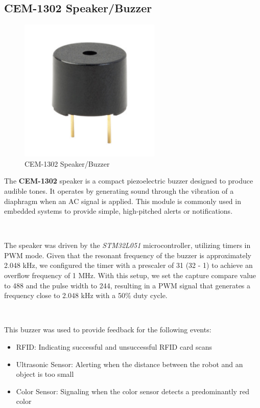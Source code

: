 \documentclass{article}
\begin{document}
\subsection{CEM-1302 Speaker/Buzzer}
\label{sec:speaker}
\begin{figure}[H]
    \centering
    \includegraphics[width=0.6\textwidth]{Figures/speaker.png} %
    \caption{CEM-1302 Speaker/Buzzer}
    \label{fig:speaker}


\end{figure}

The \textbf{CEM-1302} speaker is a compact piezoelectric buzzer designed to produce audible tones. It operates by generating sound through the vibration of a diaphragm when an AC signal is applied. This module is commonly used in embedded systems to provide simple, high-pitched alerts or notifications.

\

The speaker was driven by the \emph{STM32L051} microcontroller, utilizing timers in PWM mode. Given that the resonant frequency of the buzzer is approximately 2.048 kHz, we configured the timer with a prescaler of 31 (32 - 1) to achieve an overflow frequency of 1 MHz. With this setup, we set the capture compare value to 488 and the pulse width to 244, resulting in a PWM signal that generates a frequency close to 2.048 kHz with a 50\% duty cycle.

\

This buzzer was used to provide feedback for the following events:
\begin{itemize}
    \item RFID: Indicating successful and unsuccessful RFID card scans
    \item Ultrasonic Sensor: Alerting when the distance between the robot and an object is too small
    \item Color Sensor: Signaling when the color sensor detects a predominantly red color
\end{itemize}
\end{document}
